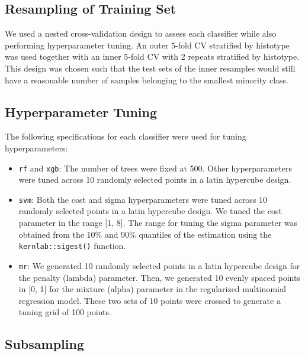 \documentclass[
]{report}
\providecommand{\tightlist}{%
  \setlength{\itemsep}{0pt}\setlength{\parskip}{0pt}}
\begin{document}
\hypertarget{resampling-of-training-set}{%
\subsection{Resampling of Training Set}\label{resampling-of-training-set}}

We used a nested cross-validation design to assess each classifier while also performing hyperparameter tuning. An outer 5-fold CV stratified by histotype was used together with an inner 5-fold CV with 2 repeats stratified by histotype. This design was chosen such that the test sets of the inner resamples would still have a reasonable number of samples belonging to the smallest minority class.

\hypertarget{hyperparameter-tuning}{%
\subsection{Hyperparameter Tuning}\label{hyperparameter-tuning}}

The following specifications for each classifier were used for tuning hyperparameters:

\begin{itemize}
\tightlist
\item
  \texttt{rf} and \texttt{xgb}: The number of trees were fixed at 500. Other hyperparameters were tuned across 10 randomly selected points in a latin hypercube design.
\item
  \texttt{svm}: Both the cost and sigma hyperparameters were tuned across 10 randomly selected points in a latin hypercube design. We tuned the cost parameter in the range {[}1, 8{]}. The range for tuning the sigma parameter was obtained from the 10\% and 90\% quantiles of the estimation using the \texttt{kernlab::sigest()} function.
\item
  \texttt{mr}: We generated 10 randomly selected points in a latin hypercube design for the penalty (lambda) parameter. Then, we generated 10 evenly spaced points in {[}0, 1{]} for the mixture (alpha) parameter in the regularized multinomial regression model. These two sets of 10 points were crossed to generate a tuning grid of 100 points.
\end{itemize}

\hypertarget{subsampling}{%
\subsection{Subsampling}\label{subsampling}}
\end{document}
